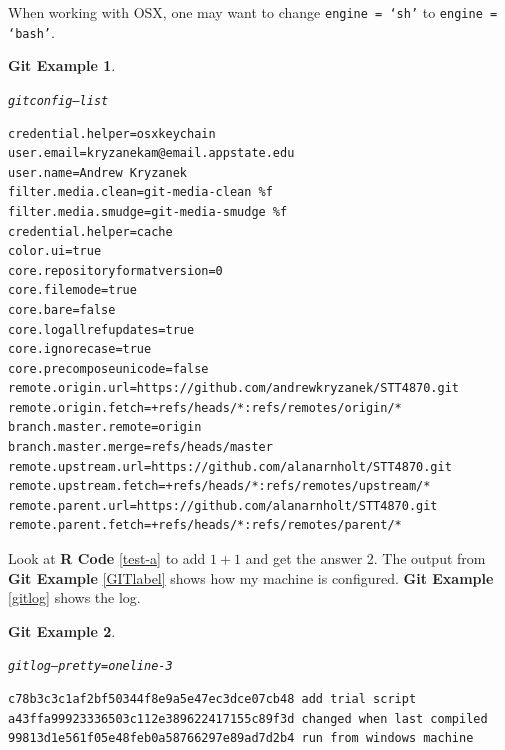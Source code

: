 \documentclass{article}\usepackage[]{graphicx}\usepackage[]{color}
\makeatletter
\newenvironment{kframe}{%
 \def\at@end@of@kframe{}%
 \ifinner\ifhmode%
  \def\at@end@of@kframe{\end{minipage}}%
  \begin{minipage}{\columnwidth}%
 \fi\fi%
 \def\FrameCommand##1{\hskip\@totalleftmargin \hskip-\fboxsep
 \colorbox{shadecolor}{##1}\hskip-\fboxsep
     \hskip-\linewidth \hskip-\@totalleftmargin \hskip\columnwidth}%
 \MakeFramed {\advance\hsize-\width
   \@totalleftmargin\z@ \linewidth\hsize
   \@setminipage}}%
 {\par\unskip\endMakeFramed%
 \at@end@of@kframe}
\newenvironment{knitrout}{}{} %
\theoremstyle{rcode}
\newtheorem{GIT}{Git Example}[section]
\makeatother
\begin{document}
When working with OSX, one may want to change \texttt{engine = `sh'} to \texttt{engine = `bash'}.

\begin{GIT}\label{GITlabel}\hfill{}\begin{knitrout}
\color{fgcolor}\begin{kframe}
\begin{alltt}
git config --list
\end{alltt}

\begin{verbatim}
credential.helper=osxkeychain
user.email=kryzanekam@email.appstate.edu
user.name=Andrew Kryzanek
filter.media.clean=git-media-clean %f
filter.media.smudge=git-media-smudge %f
credential.helper=cache
color.ui=true
core.repositoryformatversion=0
core.filemode=true
core.bare=false
core.logallrefupdates=true
core.ignorecase=true
core.precomposeunicode=false
remote.origin.url=https://github.com/andrewkryzanek/STT4870.git
remote.origin.fetch=+refs/heads/*:refs/remotes/origin/*
branch.master.remote=origin
branch.master.merge=refs/heads/master
remote.upstream.url=https://github.com/alanarnholt/STT4870.git
remote.upstream.fetch=+refs/heads/*:refs/remotes/upstream/*
remote.parent.url=https://github.com/alanarnholt/STT4870.git
remote.parent.fetch=+refs/heads/*:refs/remotes/parent/*
\end{verbatim}
\end{kframe}
\end{knitrout}\end{GIT}


Look at \textbf{R Code} \vref{test-a} to add $1 + 1$ and get the answer 2. The output from \textbf{Git Example} \vref{GITlabel} shows how my machine is configured. \textbf{Git Example} \vref{gitlog} shows the log.

\begin{GIT}\label{gitlog}\hfill{}\begin{knitrout}
\color{fgcolor}\begin{kframe}
\begin{alltt}
git log --pretty=oneline -3
\end{alltt}

\begin{verbatim}
c78b3c3c1af2bf50344f8e9a5e47ec3dce07cb48 add trial script
a43ffa99923336503c112e389622417155c89f3d changed when last compiled
99813d1e561f05e48feb0a58766297e89ad7d2b4 run from windows machine
\end{verbatim}
\end{kframe}
\end{knitrout}\end{GIT}
\end{document}

